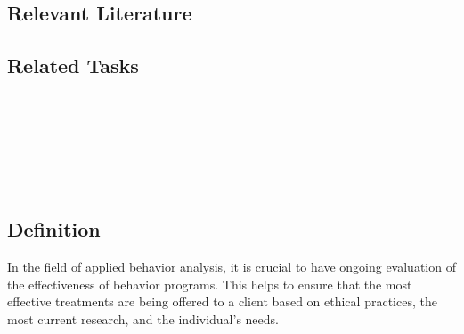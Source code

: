 \subsection{Relevant Literature}
\begin{refsection}
\nocite{test,alang2017police,clayton2018black}
\printbibliography[heading=none]
\end{refsection} 
% 
\subsection{Related Tasks}
\fourhThree{}\\
\fourhFour{}\\
\fourkTwo{}\\
\fourkThree{}\\
\fourkFour{}\\
%
%
%
%
%
%
\section{\fourkSeven{}}
\subsection{Definition}
In the field of applied behavior analysis, it is crucial to have ongoing evaluation of the effectiveness of behavior programs.  This helps to ensure that the most effective treatments are being offered to a client based on ethical practices, the most current research, and the individual's needs.  

